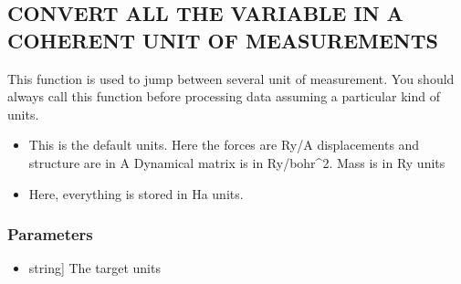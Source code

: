 \documentclass[a4paper,11pt,english]{sphinxmanual}
\begin{document}
\begin{fulllineitems}
\begin{fulllineitems}
\begin{quote}
\begin{description}
\end{description}
\end{quote}

\end{fulllineitems}


\begin{fulllineitems}
\label{\detokenize{apireference:sscha.Ensemble.Ensemble.convert_units}}
\pysigstartsignatures
{}
\pysigstopsignatures

\subsection{CONVERT ALL THE VARIABLE IN A COHERENT UNIT OF MEASUREMENTS}
\label{\detokenize{apireference:convert-all-the-variable-in-a-coherent-unit-of-measurements}}
\sphinxAtStartPar
This function is used to jump between several unit of measurement.
You should always call this function before processing data assuming
a particular kind of units.
\begin{description}
\begin{itemize}
\item {} \begin{description}
\sphinxAtStartPar
This is the default units. Here the forces are Ry/A displacements and structure are in A
Dynamical matrix is in Ry/bohr\textasciicircum{}2. Mass is in Ry units

\end{description}

\item {} \begin{description}
\sphinxAtStartPar
Here, everything is stored in Ha units.

\end{description}

\end{itemize}

\end{description}


\subsubsection{Parameters}
\label{\detokenize{apireference:parameters}}\begin{itemize}
\item {} \begin{description}
\sphinxlineitem{new\_units}{[}string{]}
\sphinxAtStartPar
The target units


\end{description}
\end{itemize}
\end{fulllineitems}
\end{fulllineitems}
\end{document}
